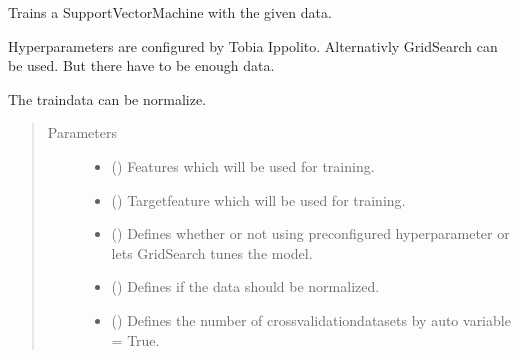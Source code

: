 \documentclass[letterpaper,10pt,english]{sphinxmanual}
\begin{document}
\begin{fulllineitems}
\label{\detokenize{anoog.model:anoog.model.model.train_svc}}
\sphinxAtStartPar
Trains a SupportVectorMachine with the given data.

\sphinxAtStartPar
Hyperparameters are configured by Tobia Ippolito. Alternativly GridSearch can be used. But there have to be enough data.

\sphinxAtStartPar
The traindata can be normalize.
\begin{quote}\begin{description}
\item[{Parameters}] \leavevmode\begin{itemize}
\item {} 
\sphinxAtStartPar
{} () \textendash{} Features which will be used for training.

\item {} 
\sphinxAtStartPar
{} () \textendash{} Target\sphinxhyphen{}feature which will be used for training.

\item {} 
\sphinxAtStartPar
{} (\sphinxstyleliteralemphasis{\sphinxupquote{, }}) \textendash{} Defines whether or not using preconfigured hyperparameter or lets GridSearch tunes the model.

\item {} 
\sphinxAtStartPar
{} (\sphinxstyleliteralemphasis{\sphinxupquote{, }}) \textendash{} Defines if the data should be normalized.

\item {} 
\sphinxAtStartPar
{} (\sphinxstyleliteralemphasis{\sphinxupquote{, }}) \textendash{} Defines the number of cross\sphinxhyphen{}validation\sphinxhyphen{}datasets by auto variable = True.


\end{itemize}
\end{description}
\end{quote}
\end{fulllineitems}
\end{document}
